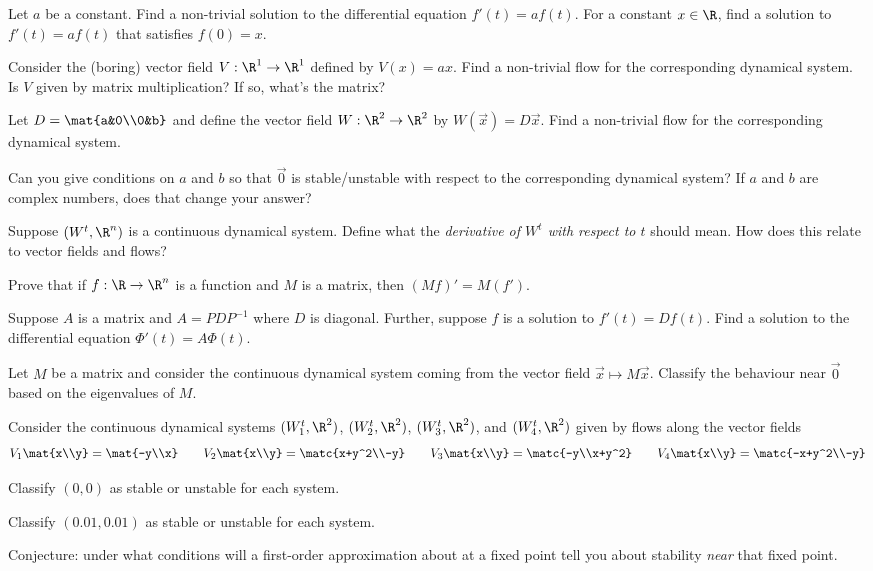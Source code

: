 	\question
	\begin{parts}
		\item Let $a$ be a constant. Find a non-trivial solution to the differential equation $f'(t)=af(t)$. For a constant $x\in \R$,
			find
			a solution to $f'(t)=af(t)$ that satisfies $f(0)=x$.
		\item Consider the (boring) vector field $V:\R^1\to\R^1$ defined by $V(x)=ax$. Find a non-trivial flow
			for the corresponding dynamical system. Is $V$ given by matrix multiplication? If so, what's the matrix?
		\item Let $D=\mat{a&0\\0&b}$ and define the vector field $W:\R^2\to\R^2$ by $W(\vec x)=D\vec x$. Find a non-trivial
			flow for the corresponding dynamical system.

			Can you give conditions on $a$ and $b$ so that $\vec 0$ is stable/unstable with respect to the corresponding
			dynamical system? If $a$ and $b$ are complex numbers, does that change your answer?
		\item Suppose $(W^t,\R^n)$ is a continuous dynamical system. Define what the \emph{derivative of $W^t$ with respect to
			$t$} should mean. How does this relate to vector fields and flows?
		\item Prove that if $f:\R\to\R^n$ is a function and $M$ is a matrix, then $(Mf)'=M(f')$.
		\item Suppose $A$ is a matrix and $A=PDP^{-1}$ where $D$ is diagonal. Further,
			suppose $f$ is a solution to $f'(t)=Df(t)$. Find a solution to the differential equation
			$\Phi'(t)=A\Phi(t)$.
		\item Let $M$ be a matrix and consider the continuous dynamical system coming from the vector field $\vec x\mapsto M\vec x$.
			Classify the behaviour near $\vec 0$ based on the eigenvalues of $M$.
	\end{parts}

	\question
	\label{QCTS}
	Consider the continuous dynamical systems $(W^t_1,\R^2)$, $(W^t_2,\R^2)$, $(W^t_3,\R^2)$, and $(W^t_4,\R^2)$
	given by flows along the vector fields
	\[
		V_1\mat{x\\y}=\mat{-y\\x}\qquad
		V_2\mat{x\\y}=\matc{x+y^2\\-y}\qquad
		V_3\mat{x\\y}=\matc{-y\\x+y^2}\qquad
		V_4\mat{x\\y}=\matc{-x+y^2\\-y}
	\]
	\begin{parts}
		\item Classify $(0,0)$ as stable or unstable for each system.
		\item Classify $(0.01,0.01)$ as stable or unstable for each system.
		\item Conjecture: under what conditions will a first-order approximation about at a
			fixed point tell you about stability \emph{near} that fixed point.
			\label{QCTS:b}
	\end{parts}

